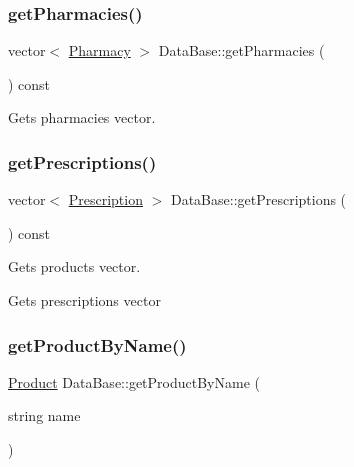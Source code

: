 \subsubsection{\texorpdfstring{get\+Pharmacies()}{getPharmacies()}}
{\footnotesize\ttfamily vector$<$ \hyperlink{classPharmacy}{Pharmacy} $>$ Data\+Base\+::get\+Pharmacies (\begin{DoxyParamCaption}{ }\end{DoxyParamCaption}) const}



Gets pharmacies vector. 

\mbox{\label{classDataBase_a2c08363a2f1360996983fdd89760af37}} 
\subsubsection{\texorpdfstring{get\+Prescriptions()}{getPrescriptions()}}
{\footnotesize\ttfamily vector$<$ \hyperlink{classPrescription}{Prescription} $>$ Data\+Base\+::get\+Prescriptions (\begin{DoxyParamCaption}{ }\end{DoxyParamCaption}) const}



Gets products vector. 

Gets prescriptions vector \mbox{\label{classDataBase_ae83d4c612ff8d93b69ab1c05345cd62c}} 
\subsubsection{\texorpdfstring{get\+Product\+By\+Name()}{getProductByName()}}
{\footnotesize\ttfamily \hyperlink{classProduct}{Product} Data\+Base\+::get\+Product\+By\+Name (\begin{DoxyParamCaption}\item[{string}]{name }\end{DoxyParamCaption})}

\mbox{\label{classDataBase_af233d5e69141c780d6a7946b1810a7a6}} 
